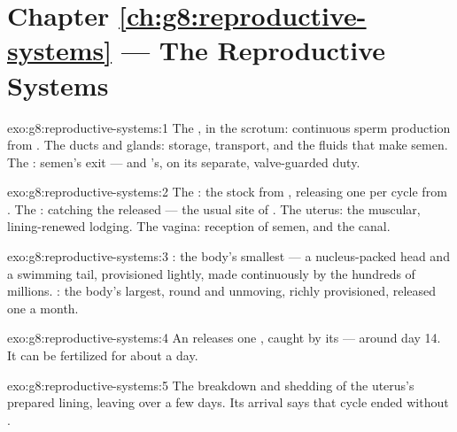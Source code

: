 \section*{Chapter \ref{ch:g8:reproductive-systems} --- The Reproductive Systems}

\begin{solution}{exo:g8:reproductive-systems:1}
The , in the scrotum: continuous sperm production
from . The ducts and glands: storage, transport, and
the fluids that make semen. The : semen's exit --- and
's, on its separate, valve-guarded duty.
\end{solution}

\begin{solution}{exo:g8:reproductive-systems:2}
The : the  stock from , releasing one
per cycle from . The : catching the released
 --- the usual site of . The uterus: the
muscular, lining-renewed lodging. The vagina: reception of
semen, and the  canal.
\end{solution}

\begin{solution}{exo:g8:reproductive-systems:3}
: the body's smallest --- a nucleus-packed head
and a swimming tail, provisioned lightly, made continuously
by the hundreds of millions. : the body's largest,
round and unmoving, richly provisioned, released one a
month.
\end{solution}

\begin{solution}{exo:g8:reproductive-systems:4}
An  releases one , caught by its  ---
around day 14. It can be fertilized for about a day.
\end{solution}

\begin{solution}{exo:g8:reproductive-systems:5}
The breakdown and shedding of the uterus's prepared lining,
leaving over a few days. Its arrival says that cycle ended
without .
\end{solution}

